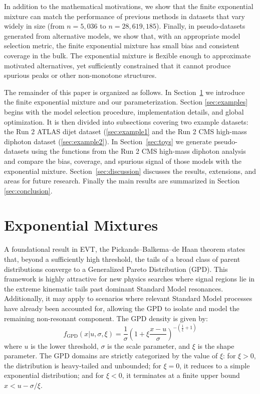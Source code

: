 \documentclass[a4paper,11pt]{article}
\begin{document}
In addition to the mathematical motivations, we show that the finite exponential mixture can 
match the performance of previous methods in datasets that vary widely in size (from $n=5,036$ 
to $n=28,619,185$). Finally, in pseudo-datasets generated from alternative models, we show that, with an appropriate model 
selection metric, the finite exponential mixture has small bias and consistent coverage in the 
bulk. The exponential mixture is flexible enough to approximate motivated alternatives, yet sufficiently constrained that it cannot produce spurious peaks or other non-monotone structures.

The remainder of this paper is organized as follows. In Section~\ref{sec:emm} we introduce the 
finite exponential mixture and our parameterization. Section \ref{sec:examples} begins with the model selection procedure, implementation details, and global optimization. It is then divided into subsections covering two example datasets: the Run 2 ATLAS dijet dataset (\ref{sec:example1} and the Run 2 CMS high-mass diphoton dataset (\ref{sec:example2}). In 
Section~\ref{sec:toys} we generate pseudo-datasets using the functions from the Run 2 CMS high-mass diphoton analysis and compare the bias, coverage, and spurious signal of those models 
with the exponential mixture. Section~\ref{sec:discussion} discusses the results, extensions, and areas for future research. Finally the main results are summarized in Section \ref{sec:conclusion}.

\section{Exponential Mixtures}
\label{sec:emm}

A foundational result in EVT, the Pickands--Balkema--de Haan theorem
\cite{Picklands_1975, Balkema_Haan_1974} states that, beyond a sufficiently high threshold, the tails of a broad class of parent distributions converge to a Generalized Pareto Distribution 
(GPD). This framework is highly attractive for new physics searches where signal regions lie in the extreme kinematic tails past dominant Standard Model resonances. Additionally, it may apply to scenarios where relevant Standard Model processes have already been accounted for, allowing the GPD to isolate and model the remaining non-resonant component. The GPD density is given by:
\begin{equation}
f_{\text{GPD}}(x | u, \sigma, \xi) = \frac{1}{\sigma} \left( 1 + \xi \frac{x - u}{\sigma} 
\right)^{-\left( \frac{1}{\xi} + 1 \right)}
\end{equation}
where $u$ is the lower threshold, $\sigma$ is the scale parameter, and $\xi$ is the shape 
parameter. The GPD domains are strictly categorized by the value of $\xi$: for $\xi>0$, the 
distribution is heavy-tailed and unbounded; for $\xi=0$, it reduces to a simple exponential 
distribution; and for $\xi<0$, it terminates at a finite upper bound $x<u-\sigma/\xi$.
\end{document}
